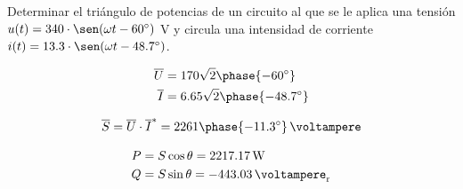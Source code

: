 \documentclass[12pt]{article}
\begin{document}


Determinar el triángulo de potencias de un circuito al que se le aplica una tensión $u(t)=340 \cdot \sen(\omega t - 60^\circ)$ V y circula una intensidad de corriente $i(t)= 13.3 \cdot \sen(\omega t-48.7^\circ)$.

\begin{align*}
  \overline{U} &= 170 \sqrt{2}\phase{\ang{-60}}\\
  \overline{I} &= 6.65\sqrt{2}\phase{\ang{-48.7}}
\end{align*}

\begin{equation*}
  \overline{S} = \overline{U}\cdot\overline{I}^* = \SI[parse-numbers=false]{2261\phase{\ang{-11.3}}}{\voltampere}
\end{equation*}


\begin{align*}
  P &= S \cos \theta = \SI{2217.17}{\watt}\\
  Q &= S \sin \theta = \SI{-443.03}{\voltampere_r}
\end{align*}

\clearpage

\section{}








\end{document}
